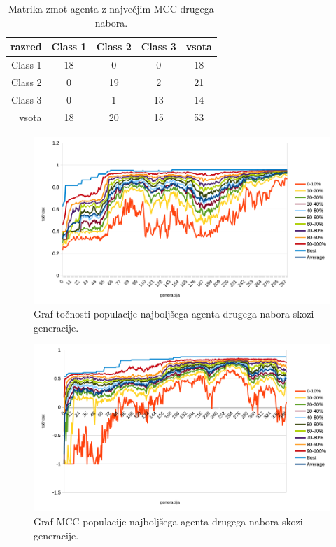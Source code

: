 \begin{table}[H]
    \centering
    \caption{Matrika zmot agenta z največjim MCC drugega nabora.}
    \begin{tabular}{||rcccc||}
        \hline
        razred  & Class 1 & Class 2 & Class 3 & vsota \\ \hline
        Class 1 & 18      & 0       & 0       & 18    \\ \hline
        Class 2 & 0       & 19      & 2       & 21    \\ \hline
        Class 3 & 0       & 1       & 13      & 14    \\ \hline
        vsota   & 18      & 20      & 15      & 53    \\ \hline
    \end{tabular}
    \label{tab:wine_mcc_2}
\end{table}

\begin{figure}[H]
    \begin{center}
        \includegraphics[width=13cm]{wine/2/acc}
    \end{center}
    \caption{Graf točnosti populacije najboljšega agenta drugega nabora skozi generacije.}
    \label{fig:wine_acc_2}
\end{figure}

\begin{figure}[H]
    \begin{center}
        \includegraphics[width=13cm]{wine/2/mcc}
    \end{center}
    \caption{Graf MCC populacije najboljšega agenta drugega nabora skozi generacije.}
    \label{fig:wine_mcc_2}
\end{figure}

